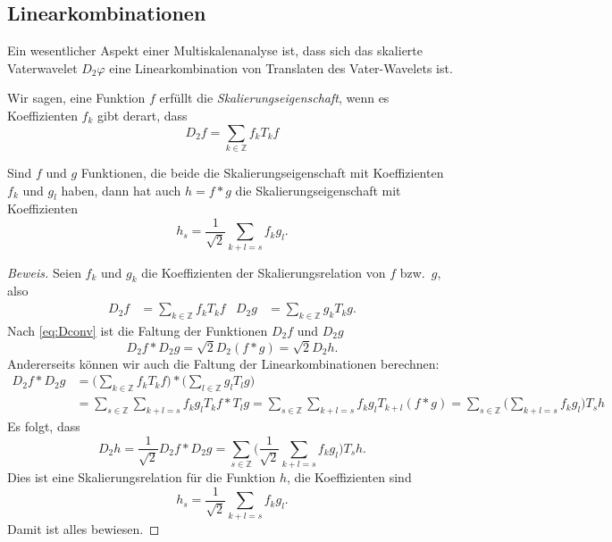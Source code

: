 \subsection{Linearkombinationen
\label{subsection:linearkombinationen}}
Ein wesentlicher Aspekt einer Multiskalenanalyse ist, dass sich das
skalierte Vaterwavelet $D_2\varphi$ eine Linearkombination von
Translaten des Vater-Wavelets ist.

\begin{definition}
Wir sagen, eine Funktion $f$ erfüllt die {\em Skalierungseigenschaft},
wenn es Koeffizienten $f_k$ gibt derart, dass
\[
D_2f = \sum_{k\in\mathbb Z} f_k T_kf
\]
\end{definition}

\begin{satz}
\label{satz:faltung-linearkombination}
Sind $f$ und $g$ Funktionen, die beide die Skalierungseigenschaft
mit Koeffizienten $f_k$ und $g_l$
haben, dann hat auch $h=f*g$ die Skalierungseigenschaft
mit Koeffizienten
\begin{equation}
h_s = \frac1{\sqrt{2}} \sum_{k+l=s}f_kg_l.
\label{eq:faltung-linearkombination}
\end{equation}
\end{satz}

\begin{proof}[Beweis]
Seien $f_k$ und $g_k$ die Koeffizienten der Skalierungsrelation von $f$
bzw.~$g$, also
\begin{align*}
D_2f
&=
\sum_{k\in\mathbb Z} f_k T_kf
&
D_2g
&=
\sum_{k\in\mathbb Z} g_k T_kg.
\end{align*}
Nach \eqref{eq:Dconv} ist die Faltung der Funktionen $D_2f$ und $D_2g$
\[
D_2f * D_2g
=
\sqrt{2}
D_2(f*g)
=
\sqrt{2}
D_2h.
\]
Andererseits können wir auch die Faltung der Linearkombinationen 
berechnen:
\begin{align*}
D_2f * D_2g
&=
\biggl( \sum_{k\in\mathbb Z} f_kT_kf \biggr)
*
\biggl( \sum_{l\in\mathbb Z} g_lT_lg \biggr)
\\
&=
\sum_{s\in\mathbb Z}
\sum_{k+l=s} f_kg_l T_kf * T_lg
=
\sum_{s\in\mathbb Z}
\sum_{k+l=s} f_kg_l T_{k+l}(f * g)
=
\sum_{s\in\mathbb Z}
\biggl(\sum_{k+l=s} f_kg_l\biggr) T_sh
\end{align*}
Es folgt, dass
\[
D_2h
=
\frac1{\sqrt{2}} D_2f * D_2g
=
\sum_{s\in\mathbb Z}
\biggl(\frac1{\sqrt{2}}\sum_{k+l=s} f_kg_l\biggr) T_sh.
\]
Dies ist eine Skalierungsrelation für die Funktion $h$, die Koeffizienten
sind
\[
h_s = \frac1{\sqrt{2}} \sum_{k+l=s}f_kg_l.
\]
Damit ist alles bewiesen.
\end{proof}






